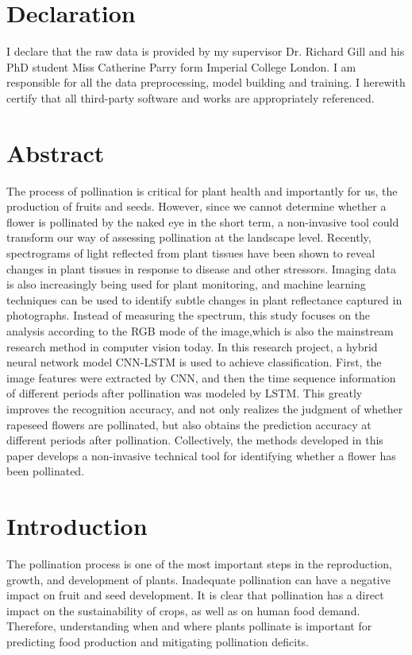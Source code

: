 \documentclass[11pt,a4paper]{article}
\begin{document}
\begin{spacing}{1.5}


\renewcommand\thesection{\arabic{section}}

\section*{Declaration}
I declare that the raw data is provided by my supervisor Dr. Richard Gill and his PhD student Miss Catherine Parry form Imperial College London. I am responsible for all the data preprocessing, model building and training. I herewith certify that all third-party software and works are appropriately referenced.

\newpage

\tableofcontents

\newpage

\section*{Abstract}
The process of pollination is critical for plant health and importantly for us, the production of fruits and seeds.
However, since we cannot determine whether a flower is pollinated by the naked eye in the short term, a non-invasive tool could transform our way of assessing pollination at the landscape level.
Recently, spectrograms of light reflected from plant tissues have been shown to reveal changes in plant tissues in response to disease and other stressors. Imaging data is also increasingly being used for plant monitoring, and machine learning techniques can be used to identify subtle changes in plant reflectance captured in photographs. Instead of measuring the spectrum, this study focuses on the analysis according to the RGB mode of the image,which is also the mainstream research method in computer vision today.
In this research project, a hybrid neural network model CNN-LSTM is used to achieve classification. First, the image features were extracted by CNN, and then the time sequence information of different periods after pollination was modeled by LSTM. This greatly improves the recognition accuracy, and not only realizes the judgment of whether rapeseed flowers are pollinated, but also obtains the prediction accuracy at different periods after pollination.
Collectively, the methods developed in this paper develops a non-invasive technical tool for identifying whether a flower has been pollinated.

\newpage

\section{Introduction}
The pollination process is one of the most important steps in the reproduction, growth, and development of plants. Inadequate pollination can have a negative impact on fruit and seed development. It is clear that pollination has a direct impact on the sustainability of crops, as well as on human food demand. Therefore, understanding when and where plants pollinate is important for predicting food production and mitigating pollination deficits.\citep{mayer2011pollination}


\end{spacing}
\end{document}
